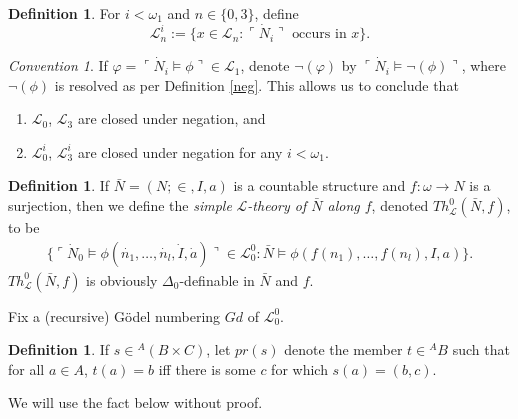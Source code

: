 \documentclass[12pt, twoside]{memoir}
\numberwithin{equation}{section}
\theoremstyle{definition}
\newtheorem{defi}[thm]{Definition}
\theoremstyle{remark}
\newtheorem{con}[thm]{Convention}
\theoremstyle{definition}
\theoremstyle{definition}
\theoremstyle{definition}
\theoremstyle{remark}
\begin{document}
\begin{defi}
For $i < \omega_1$ and $n \in \{0, 3\}$, define 
\begin{equation*}
    \mathcal{L}^i_n := \{x \in \mathcal{L}_n : \ulcorner \dot{N}_i \urcorner \text{ occurs in } x\}.
\end{equation*}
\end{defi}

\begin{con}
If $\varphi = \ulcorner \dot{N}_i \models \phi \urcorner \in \mathcal{L}_1$, denote $\neg(\varphi)$ by $\ulcorner \dot{N}_i \models \neg(\phi) \urcorner$, where $\neg(\phi)$ is resolved as per Definition \ref{neg}. This allows us to conclude that 
\begin{enumerate}[label=(\alph*)]
    \item $\mathcal{L}_0$, $\mathcal{L}_3$ are closed under negation, and
    \item $\mathcal{L}^i_0$, $\mathcal{L}^i_3$ are closed under negation for any $i < \omega_1$.
\end{enumerate}
\end{con}

\begin{defi}
If $\bar{N} = (N; \in, I, a)$ is a countable structure and $f : \omega \longrightarrow N$ is a surjection, then we define the \emph{simple} $\mathcal{L}$\emph{-theory of $\bar{N}$ along $f$}, denoted $Th^{0}_{\mathcal{L}}(\bar{N}, f)$, to be 
\begin{align*}
    \{\ulcorner \dot{N}_0 \models \phi(\dot{n_1}, \ldots, \dot{n_l}, \dot{I}, \dot{a}) \urcorner \in \mathcal{L}^0_0 : \bar{N} \models \phi(f(n_1), \ldots, f(n_l), I, a)\}.
\end{align*}
$Th^{0}_{\mathcal{L}}(\bar{N}, f)$ is obviously $\Delta_0$-definable in $\bar{N}$ and $f$.
\end{defi}

Fix a (recursive) G\"{o}del numbering $Gd$ of $\mathcal{L}^0_0$.

\begin{defi}\label{nota4}
If $s \in {^{A}{(B \times C)}}$, let $pr(s)$ denote the member $t \in {^{A}{B}}$ such that for all $a \in A$, $t(a) = b$ iff there is some $c$ for which $s(a) = (b, c)$.
\end{defi}

We will use the fact below without proof.
\end{document}
